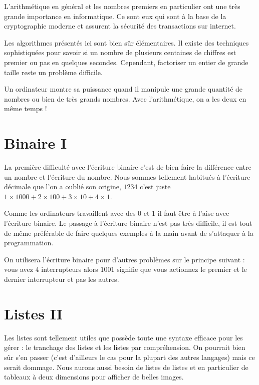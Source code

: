 \documentclass[11pt,class=report,crop=false]{standalone}
\begin{document}
L'arithmétique en général et les nombres premiers en particulier ont une très grande importance en informatique. Ce sont eux qui sont à la base de la cryptographie moderne et assurent la sécurité des transactions sur internet.

Les algorithmes présentés ici sont bien sûr élémentaires. Il existe des techniques sophistiquées pour savoir si un nombre de plusieurs centaines de chiffres est premier ou pas en quelques secondes. Cependant, factoriser un entier de grande taille reste un problème difficile.

Un ordinateur montre sa puissance quand il manipule une grande quantité de nombres ou bien de très grands nombres. Avec l'arithmétique, on a les deux en même temps !


\section{Binaire I}

La première difficulté avec l'écriture binaire c'est de bien faire la différence entre un nombre et l'écriture du nombre. Nous sommes tellement habitués à l'écriture décimale que l'on a oublié son origine, $1234$ c'est juste $1\times 1000 + 2 \times 100 + 3 \times 10 + 4\times 1$.

Comme les ordinateurs travaillent avec des $0$ et $1$ il faut être à l'aise avec l'écriture binaire. Le passage à l'écriture binaire n'est pas très difficile, il est tout de même préférable de faire quelques exemples à la main avant de s'attaquer à la programmation.

On utilisera l'écriture binaire pour d'autres problèmes sur le principe suivant : vous avez $4$ interrupteurs alors $1001$ signifie que vous actionnez le premier et le dernier interrupteur et pas les autres.


\section{Listes II}

Les listes sont tellement utiles que \Python{} possède toute une syntaxe efficace pour les gérer : le tranchage des listes et les listes par compréhension. On pourrait bien sûr s'en passer (c'est d'ailleurs le cas pour la plupart des  autres langages) mais ce serait dommage.
Nous aurons aussi besoin de listes de listes et en particulier de tableaux à deux dimensions pour afficher de belles images.
\end{document}
